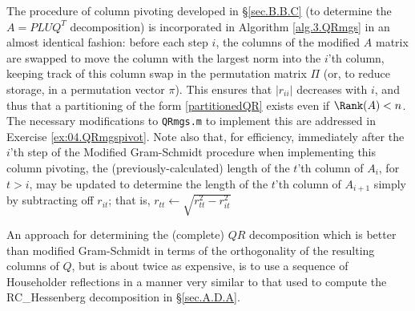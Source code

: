 The procedure of column pivoting developed in \S \ref{sec.B.B.C} (to determine the $A=PLU\!Q^T$ decomposition)
is incorporated in Algorithm \ref{alg.3.QRmgs} in an almost identical fashion: before each step $i$,
the columns of the modified $A$ matrix are swapped to move the column with the largest
norm into the $i$'th column, keeping track of this column swap in the permutation matrix $\Pi$ (or, to reduce storage,
in a permutation vector $\pi$). This ensures that $|r_{ii}|$ decreases with $i$,
and thus that a partitioning of the form \eqref{partitionedQR} exists even if $\Rank(A)<n$.  The necessary modifications to {\tt QRmgs.m}
to implement this are addressed in Exercise \ref{ex:04.QRmgspivot}.  
Note also that, for efficiency, immediately after the $i$'th step of the Modified Gram-Schmidt procedure when implementing
this column pivoting, the (previously-calculated)
length of the $t$'th column of $A_{i}$, for $t> i$, may be updated to determine the length of the $t$'th
column of $A_{i+1}$ simply by subtracting off $r_{i t}$; that is, $r_{tt} \leftarrow \sqrt{r_{tt}^2 - r_{it}^2}$ 


\noindent An approach for determining the (complete) $QR$ decomposition which is
better than modified Gram-Schmidt in terms of the orthogonality of the
resulting columns of $Q$, but is about twice as expensive, is to use a
sequence of Householder reflections in a manner very similar to that
used to compute the RC_Hessenberg decomposition in \S \ref{sec.A.D.A}.

